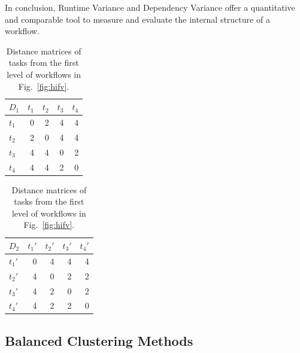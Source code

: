 \documentclass[final]{IEEEtran}
\begin{document}
In conclusion, Runtime Variance and Dependency Variance offer a quantitative and comparable tool to measure and evaluate the internal structure of a workflow. 



\begin{table}[htb]
	\footnotesize
	\centering
	\begin{tabular}{l|rrrr}
		$D_1$ & $t_1$ & $t_2$ & $t_3$ &$t_4$\\
		\hline
		$t_1$ & 0 & 2 & 4 & 4 \\
		$t_2$ & 2 & 0 & 4 & 4 \\
		$t_3$ & 4 & 4 & 0 & 2\\
		$t_4$ & 4 & 4 & 2 & 0 \\
	\end{tabular}
	\quad
	\begin{tabular}{l|rrrr}
		$D_2$ & $t_1'$ & $t_2'$ & $t_3'$ &$t_4'$\\
		\hline
		$t_1'$ & 0 & 4 & 4 & 4 \\
		$t_2'$ & 4 & 0 & 2 & 2 \\
		$t_3'$ & 4 & 2 & 0 & 2\\
		$t_4'$ & 4 & 2 & 2 & 0 \\
	\end{tabular}
	\caption{Distance matrices of tasks from the first level of workflows in Fig.~\ref{fig:hifv}.}
	\label{tab:1}
	\vspace{-20pt}
\end{table}


\subsection{Balanced Clustering Methods}
\end{document}
